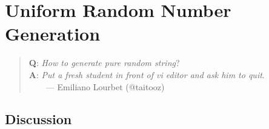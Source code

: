 \chapter{Uniform Random Number Generation}

\setcounter{problem}{1}

\begin{quote}
{\bf Q}: {\em How to generate pure random string}? \\
{\bf A}: {\em Put a fresh student in front of vi editor and ask him to quit}.\\
~~~~--- Emiliano Lourbet (@taitooz)
\end{quote}

\section{Discussion}

